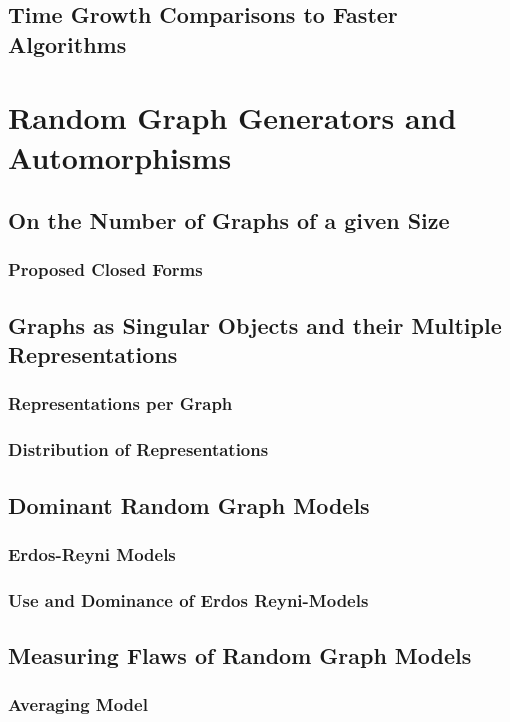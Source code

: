 \documentclass[11pt,a4paper]{report}
\begin{document}
\section{Time Growth Comparisons to Faster Algorithms}



\chapter{Random Graph Generators and Automorphisms}

\section{On the Number of Graphs of a given Size}
\subsection{Proposed Closed Forms}

\section{Graphs as Singular Objects and their Multiple Representations}
\subsection{Representations per Graph}
\subsection{Distribution of Representations}

\section{Dominant Random Graph Models}
\subsection{Erdos-Reyni Models}
\subsection{Use and Dominance of Erdos Reyni-Models}

\section{Measuring Flaws of Random Graph Models}
\subsection{Averaging Model}
\end{document}
